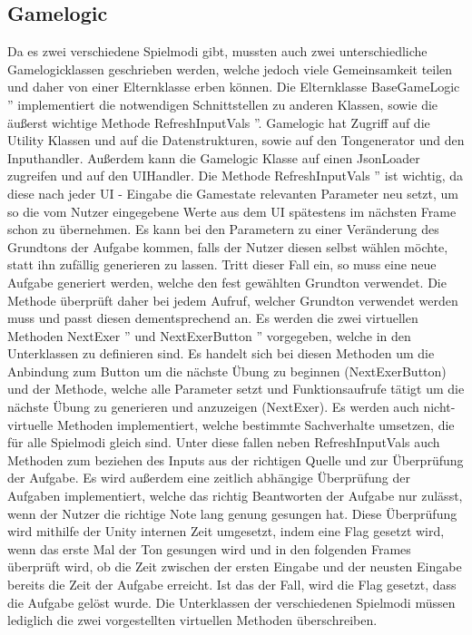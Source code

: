 \subsection*{Gamelogic}
Da es zwei verschiedene Spielmodi gibt, mussten auch zwei unterschiedliche Gamelogicklassen geschrieben werden, welche jedoch viele Gemeinsamkeit teilen und daher von einer Elternklasse erben können. Die Elternklasse \glqq BaseGameLogic '' implementiert die notwendigen Schnittstellen zu anderen Klassen, sowie die äußerst wichtige Methode \glqq RefreshInputVals ''. Gamelogic hat Zugriff auf die Utility Klassen und auf die Datenstrukturen, sowie auf den Tongenerator und den Inputhandler. Außerdem kann die Gamelogic Klasse auf einen JsonLoader zugreifen und auf den UIHandler. Die Methode \glqq RefreshInputVals '' ist wichtig, da diese nach jeder UI - Eingabe die Gamestate relevanten Parameter neu setzt, um so die vom Nutzer eingegebene Werte aus dem UI spätestens im nächsten Frame schon zu übernehmen. Es kann bei den Parametern zu einer Veränderung des Grundtons der Aufgabe kommen, falls der Nutzer diesen selbst wählen möchte, statt ihn zufällig generieren zu lassen. Tritt dieser Fall ein, so muss eine neue Aufgabe generiert werden, welche den fest gewählten Grundton verwendet. Die Methode überprüft daher bei jedem Aufruf, welcher Grundton verwendet werden muss und passt diesen dementsprechend an. Es werden die zwei virtuellen Methoden \glqq NextExer '' und \glqq NextExerButton '' vorgegeben, welche in den Unterklassen zu definieren sind. Es handelt sich bei diesen Methoden um die Anbindung zum Button um die nächste Übung zu beginnen (NextExerButton) und der Methode, welche alle Parameter setzt und Funktionsaufrufe tätigt um die nächste Übung zu generieren und anzuzeigen (NextExer). Es werden auch nicht-virtuelle Methoden implementiert, welche bestimmte Sachverhalte umsetzen, die für alle Spielmodi gleich sind. Unter diese fallen neben RefreshInputVals auch Methoden zum beziehen des Inputs aus der richtigen Quelle und zur Überprüfung der Aufgabe. Es wird außerdem eine zeitlich abhängige Überprüfung der Aufgaben implementiert, welche das richtig Beantworten der Aufgabe nur zulässt, wenn der Nutzer die richtige Note lang genung gesungen hat. Diese Überprüfung wird mithilfe der Unity internen Zeit umgesetzt, indem eine Flag gesetzt wird, wenn das erste Mal der Ton gesungen wird und in den folgenden Frames überprüft wird, ob die Zeit zwischen der ersten Eingabe und der neusten Eingabe bereits die Zeit der Aufgabe erreicht. Ist das der Fall, wird die Flag gesetzt, dass die Aufgabe gelöst wurde. Die Unterklassen der verschiedenen Spielmodi müssen lediglich die zwei vorgestellten virtuellen Methoden überschreiben.\\
